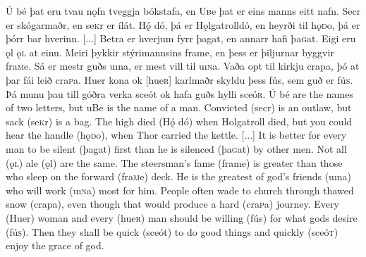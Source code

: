 \begin{paracol}{2}
    Ú bé þat eru tvau nǫfn tveggja bókstafa, en U\textsc{b}e þat er eins manns eitt nafn. Secr er skógarmaðr, en se\textsc{k}r er ílát. Hǫ́ dó, þá er Hǫlgatroll\footnotemark dó, en heyrði til hǫ\textsc{d}o, þá er þórr bar hverinn. [...] Betra er hverjum fyrr þagat, en annarr hafi þa\textsc{g}at. Eigi eru ǫl ǫ\textsc{l} at einu. Meiri þykkir stýrimannsins frame, en þess er þiljurnar byggvir fra\textsc{m}e. Sá er mestr guðs uına, er mest vill til uı\textsc{n}a. Vaða opt til kirkju crapa, þó at þar fái leið cra\textsc{p}a. Huer kona ok [hue\textsc{r}] karlmaðr skyldu þess fús, sem guð er fú\textsc{s}. Þá munu þau till góðra verka sceót ok hafa guðs hylli sceó\textsc{r}.
    \switchcolumn
    Ú bé are the names of two letters, but uBe is the name of a man. Convicted (secr) is an outlaw, but sack (se\textsc{k}r) is a bag. The high died (Hǫ́ dó) when Holgatroll died, but you could hear the handle (hǫ\textsc{d}o), when Thor carried the kettle. [...] It is better for every man to be silent (þagat) first than he is silenced (þa\textsc{g}at) by other men. Not all (ǫ\textsc{l}) ale (ǫl) are the same. The steersman's fame (frame) is greater than those who sleep on the forward (fra\textsc{m}e) deck. He is the greatest of god's friends (uına) who will work (uı\textsc{n}a) most for him. People often wade to church through thawed snow (crapa), even though that would produce a hard (cra\textsc{p}a) journey. Every (Huer) woman and every (hue\textsc{r}) man should be willing (fús) for what gods desire (fú\textsc{s}). Then they shall be quick (sceót) to do good things and quickly (sceó\textsc{t}) enjoy the grace of god.
\end{paracol}

